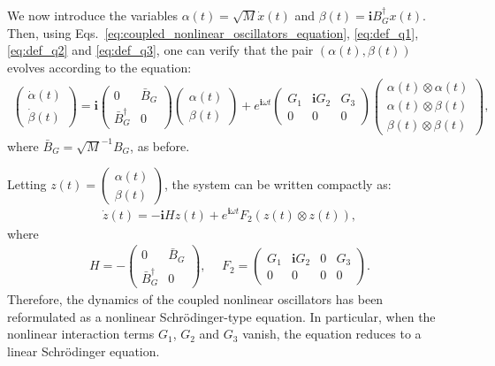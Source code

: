 \documentclass[superscriptaddress,onecolumn,nofootinbib,longbibliography,a4paper,accepted=2026-09-29]{quantumarticle}
\theoremstyle{plain}
\theoremstyle{definition}
\numberwithin{thm}{section}
\numberwithin{assumption}{section}
\numberwithin{lemma}{section}
\numberwithin{prop}{section}
\numberwithin{cor}{section}
\numberwithin{definition}{section}
\numberwithin{rmk}{section}
\numberwithin{equation}{section}
\newcommand{\lrb}[1]{\left ( #1 \right )}
\renewcommand{\i}{\ensuremath{\mathbf{i}}}
\begin{document}
We now introduce the variables $\alpha(t)=\sqrt{M}\dot{x}(t)$
and $\beta(t)=\i B_G^\dagger x(t)$.
Then, using Eqs.~\eqref{eq:coupled_nonlinear_oscillators_equation}, \eqref{eq:def_q1}, \eqref{eq:def_q2} and \eqref{eq:def_q3}, one can  verify that the pair $(\alpha(t), \beta(t))$  evolves according to the equation:
\begin{align}
    \begin{pmatrix}
        \dot{\alpha}(t) \\
        \dot{\beta}(t)        
    \end{pmatrix}
    =\i \begin{pmatrix}
0 & \bar{B}_G \\
\bar{B}_G^{\dagger} & 0
\end{pmatrix} \begin{pmatrix}
        \alpha(t) \\
        \beta(t)        
    \end{pmatrix}
    +e^{\i \omega t}\begin{pmatrix}
    G_1 & \i G_2 & G_3 \\
    0 & 0 & 0
\end{pmatrix} \begin{pmatrix}
    \alpha(t) \otimes \alpha(t) \\
    \alpha(t) \otimes \beta(t) \\
    \beta(t) \otimes \beta(t)
\end{pmatrix},
\end{align}
where $\bar{B}_G=\sqrt{M}^{-1}B_G$, as before. 


Letting $z(t)=\begin{pmatrix}
    \alpha(t) \\
    \beta(t)
\end{pmatrix}$, the system can be written compactly as:
\begin{align}
\dot{z}(t) = -\i H z(t) + e^{\i \omega t} F_2 \lrb{z(t)\otimes z(t)},    
\end{align}
where
\begin{align}
H = -\begin{pmatrix}
0 & \bar{B}_G \\
\bar{B}_G^{\dagger} & 0
\end{pmatrix},~&~
F_2=\begin{pmatrix}
    G_1 & \i G_2 & 0 & G_3 \\
    0 & 0 & 0 & 0
\end{pmatrix}. 
\end{align}
Therefore, the dynamics of the coupled nonlinear oscillators has been reformulated as a nonlinear Schr\"{o}dinger-type equation. In particular, when the nonlinear interaction terms $G_1$, $G_2$ and $G_3$ vanish, the equation reduces to a linear Schr\"{o}dinger equation.
\end{document}
